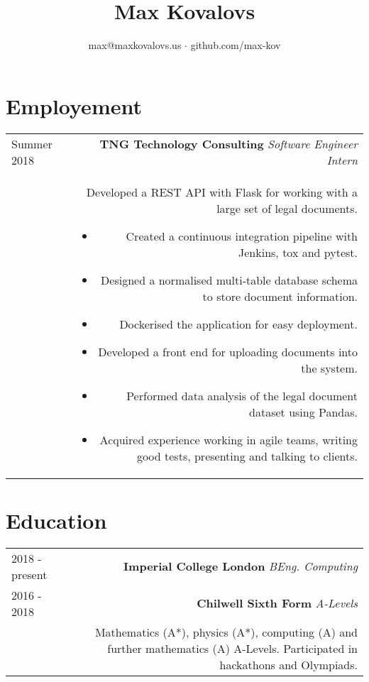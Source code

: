 \documentclass[]{article}
\title{Max Kovalovs}
\author{}
\date{}
\subtitle{max@maxkovalovs.us $\cdot$ github.com/max-kov}
\begin{document}
\maketitle

\section*{Employement}
\begin{tabular}{L!{\color{lightgray}\vrule width 0.5pt}R}
Summer 2018&{\bf TNG Technology Consulting} \hfill \textit{Software Engineer Intern}\\
&Developed a REST API with Flask for working with a large set of legal documents.
\begin{itemize}
\item Created a continuous integration pipeline with Jenkins, tox and pytest.
\item Designed a normalised multi-table database schema to store document information.
\item Dockerised the application for easy deployment.
\item Developed a front end for uploading documents into the system.
\item Performed data analysis of the legal document dataset using Pandas.
\item Acquired experience working in agile teams, writing good tests, presenting and talking to clients.
\end{itemize}
\end{tabular}

\section*{Education}
\begin{tabular}{L!{\color{lightgray}\vrule width 0.5pt}R}
2018 - present&{\bf Imperial College London} \hfill \textit{BEng. Computing}\\
2016 - 2018&{\bf Chilwell Sixth Form} \hfill \textit{A-Levels}\\
&Mathematics (A*), physics (A*), computing (A) and further mathematics (A) A-Levels. Participated in hackathons and Olympiads.
\end{tabular}
\end{document}
